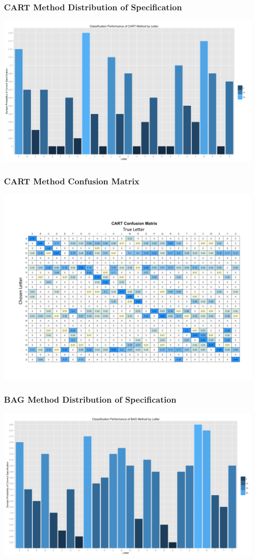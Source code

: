 \documentclass{beamer}
\begin{document}
\begin{frame}
\frametitle{CART Method Distribution of Specification}
\begin{center} 
\includegraphics[width=1 \textwidth]{cartPlot}
\end{center}
\end{frame}


\begin{frame}
\frametitle{CART Method Confusion Matrix}
\begin{center} 
\includegraphics[width=.9 \textwidth]{cartConfuse}
\end{center}
\end{frame}

\begin{frame}
\frametitle{BAG Method Distribution of Specification}
\begin{center} 
\includegraphics[width=1 \textwidth]{bagPlot}
\end{center}
\end{frame}
\end{document}
